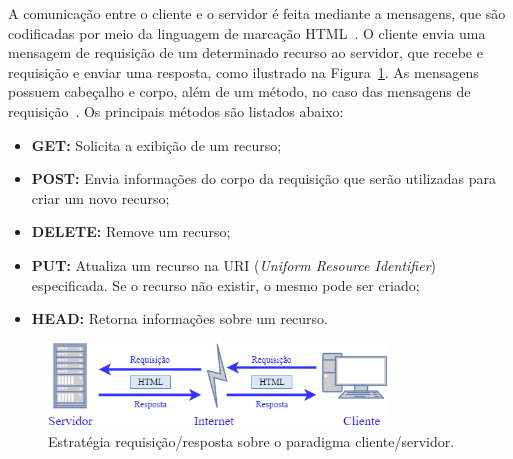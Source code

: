 A comunicação entre o cliente e o servidor é feita mediante a  mensagens, que são codificadas por meio da linguagem de marcação HTML~\cite{raggett1999html}. O cliente envia uma mensagem de requisição de um determinado recurso ao servidor, que recebe e requisição e enviar uma resposta, como ilustrado na Figura~\ref{fig:req/res}. As mensagens possuem cabeçalho e corpo, além de um método, no caso das mensagens de requisição~\cite{fielding2014hypertext}. Os principais métodos são listados abaixo:
\begin{itemize}
    \item \textbf{GET:} Solicita a exibição de um recurso;
    \item \textbf{POST:} Envia informações do corpo da requisição que serão utilizadas para criar um novo recurso;
    \item \textbf{DELETE:} Remove um recurso;
    \item \textbf{PUT:} Atualiza um recurso na URI (\textit{Uniform Resource Identifier}) especificada. Se o recurso não existir, o mesmo pode ser criado;
    \item \textbf{HEAD:} Retorna informações sobre um recurso.
\end{itemize}

\begin{figure}[ht]
\centering
\includegraphics[width=0.8\textwidth]{imagens/cliente_servidor.png}
\caption{Estratégia requisição/resposta sobre o paradigma cliente/servidor.
\label{fig:req/res}}
\end{figure}
\FloatBarrier

